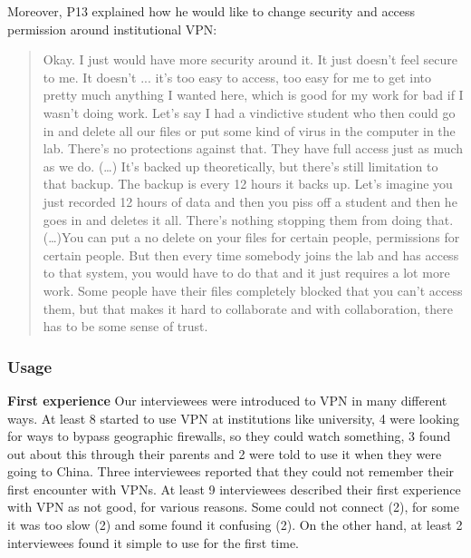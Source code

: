 Moreover, P13 explained how he would like to change security and access
permission around institutional VPN: \begin{quote}Okay. I just would have more
    security around it. It just doesn't feel secure to me. It doesn't ... it's
    too easy to access, too easy for me to get into pretty much anything I
    wanted here, which is good for my work for bad if I wasn't doing work.
    Let's say I had a vindictive student who then could go in and delete all
    our files or put some kind of virus in the computer in the lab. There's no
    protections against that. They have full access just as much as we do. (…)
    It's backed up theoretically, but there's still limitation to that backup.
    The backup is every 12 hours it backs up. Let's imagine you just recorded
    12 hours of data and then you piss off a student and then he goes in and
    deletes it all. There's nothing stopping them from doing that.  (\dots)You
can put a no delete on your files for certain people, permissions for certain
people. But then every time somebody joins the lab and has access to that
system, you would have to do that and it just requires a lot more work. Some
people have their files completely blocked that you can't access them, but
that makes it hard to collaborate and with collaboration, there has to be some
sense of trust.\end{quote}



\subsubsection{Usage} \textbf{First experience} Our interviewees were
introduced to VPN in many different ways. At least 8 started to use VPN at
institutions like university, 4 were looking for ways to bypass geographic
firewalls, so they could watch something, 3 found out about this through their
parents and 2 were told to use it when they were going to China. Three
interviewees reported that they could not remember their first encounter with
VPNs.  At least 9 interviewees described their first experience with VPN as
not good, for various reasons. Some could not connect (2), for some it was too
slow (2) and some found it confusing (2).  On the other hand, at least 2
interviewees found it simple to use for the first time.


